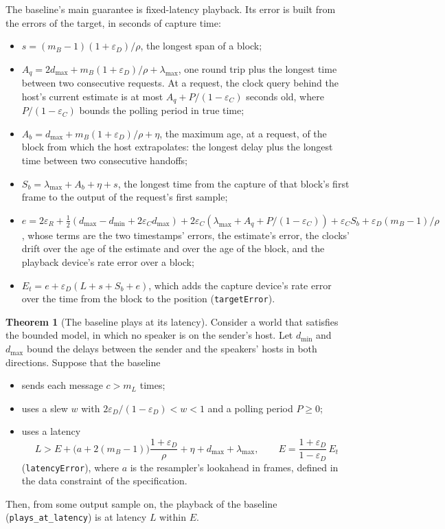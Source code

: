 \documentclass[11pt,a4paper]{article}
\newcommand{\lean}[1]{\texttt{#1}}
\theoremstyle{definition}
\newtheorem{theorem}[definition]{Theorem}
\begin{document}
The baseline's main guarantee is fixed-latency playback. Its error is built
from the errors of the target, in seconds of capture time:
\begin{itemize}
\item $s = (m_B - 1)(1 + \varepsilon_D)/\rho$, the longest span of a block;
\item $A_q = 2 d_{\max} + m_B (1 + \varepsilon_D)/\rho + \lambda_{\max}$,
  one round trip plus the longest time between two consecutive requests.
  At a request, the clock query behind the host's current estimate is at
  most $A_q + P/(1 - \varepsilon_C)$ seconds old, where
  $P/(1 - \varepsilon_C)$ bounds the polling period in true time;
\item $A_b = d_{\max} + m_B (1 + \varepsilon_D)/\rho + \eta$, the maximum
  age, at a request, of the block from which the host extrapolates: the
  longest delay plus the longest time between two consecutive handoffs;
\item $S_b = \lambda_{\max} + A_b + \eta + s$, the longest time from the
  capture of that block's first frame to the output of the request's first
  sample;
\item $e = 2\varepsilon_R + \tfrac12 (d_{\max} - d_{\min} + 2\varepsilon_C
  d_{\max}) + 2\varepsilon_C (\lambda_{\max} + A_q + P/(1 - \varepsilon_C))
  + \varepsilon_C S_b + \varepsilon_D (m_B - 1)/\rho$, whose terms are the
  two timestamps' errors, the estimate's error, the clocks' drift over the
  age of the estimate and over the age of the block, and the playback
  device's rate error over a block;
\item $E_t = e + \varepsilon_D (L + s + S_b + e)$, which adds the capture
  device's rate error over the time from the block to the position
  (\lean{targetError}).
\end{itemize}

\begin{theorem}[The baseline plays at its latency]\label{thm:baseline}
Consider a world that satisfies the bounded model, in which no speaker is
on the sender's host. Let $d_{\min}$ and $d_{\max}$ bound the delays between
the sender and the speakers' hosts in both directions. Suppose that the
baseline
\begin{itemize}
\item sends each message $c > m_L$ times;
\item uses a slew $w$ with $2\varepsilon_D/(1 - \varepsilon_D) < w < 1$ and a
  polling period $P \ge 0$;
\item uses a latency
  \[
    L > E + \bigl(a + 2(m_B - 1)\bigr)\frac{1 + \varepsilon_D}{\rho} + \eta
      + d_{\max} + \lambda_{\max},
    \qquad E = \frac{1 + \varepsilon_D}{1 - \varepsilon_D}\, E_t
  \]
  (\lean{latencyError}), where $a$ is the resampler's lookahead in frames,
  defined in the data constraint of the specification.
\end{itemize}
Then, from some output sample on, the playback of the baseline
(\lean{plays\_at\_latency}) is at latency $L$ within $E$.
\end{theorem}
\end{document}
